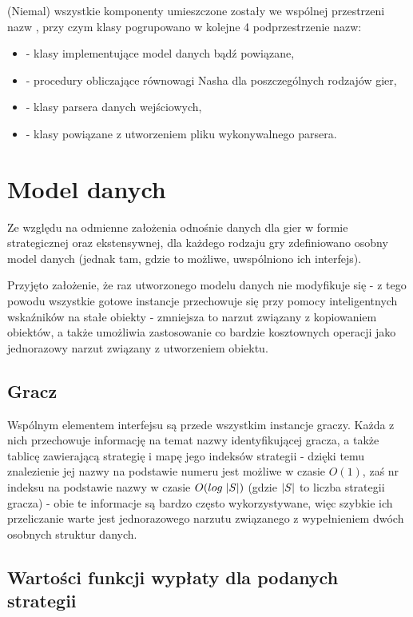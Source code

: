 \documentclass[polish]{standalone}
\begin{document}
(Niemal) wszystkie komponenty umieszczone zostały we wspólnej przestrzeni nazw , przy czym klasy pogrupowano
w kolejne 4 podprzestrzenie nazw:
\begin{itemize}
\item {} - klasy implementujące model danych bądź powiązane,
\item {} - procedury obliczające równowagi Nasha dla poszczególnych rodzajów gier,
\item {} - klasy parsera danych wejściowych,
\item {} - klasy powiązane z utworzeniem pliku wykonywalnego parsera.
\end{itemize}

\section{Model danych}

Ze względu na odmienne założenia odnośnie danych dla gier w formie strategicznej oraz ekstensywnej, dla każdego rodzaju
gry zdefiniowano osobny model danych (jednak tam, gdzie to możliwe, uwspólniono ich interfejs).

Przyjęto założenie, że raz utworzonego modelu danych nie modyfikuje się - z tego powodu wszystkie gotowe instancje
przechowuje się przy pomocy inteligentnych wskaźników na stałe obiekty - zmniejsza to narzut związany z kopiowaniem
obiektów, a także umożliwia zastosowanie co bardzie kosztownych operacji jako jednorazowy narzut związany z utworzeniem
obiektu.

\subsection{Gracz}

Wspólnym elementem interfejsu są przede wszystkim instancje graczy. Każda z nich przechowuje informację na temat nazwy
identyfikującej gracza, a także tablicę zawierającą strategię i mapę jego indeksów strategii - dzięki temu znalezienie
jej nazwy na podstawie numeru jest możliwe w czasie $O(1)$, zaś nr indeksu na podstawie nazwy w czasie 
$O(log\;|S|)$ (gdzie $|S|$ to liczba strategii gracza) - obie te informacje są bardzo często wykorzystywane,
więc szybkie ich przeliczanie warte jest jednorazowego narzutu związanego z wypełnieniem dwóch osobnych struktur danych.

\subsection{Wartości funkcji wypłaty dla podanych strategii}
\end{document}
